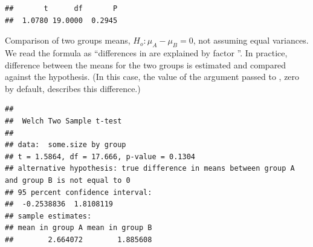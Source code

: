 \documentclass[krantz2]{krantz}\usepackage{knitr}
\begin{document}
\begin{knitrout}\footnotesize
{}\color{fgcolor}\begin{kframe}
\begin{alltt}
 \hlkwb{=} \hlstd{(}\hlopt{$} \hlopt{/} 
 \hlkwb{=} \hlstd{(}\hlopt{$} \hlopt{-} \hlstd{)} \hlopt{/}  
 \hlkwb{<-}   \hlstd{=}  \hlopt{-} \hlstd{,}  \hlstd{=} \hlstd{)} \hlopt{*}  
\hlstd{(}\hlstd{(}   \hlstd{=}  \hlopt{-} \hlstd{,}   \hlstd{)} 
\end{alltt}
\begin{verbatim}
##       t      df       P 
##  1.0780 19.0000  0.2945
\end{verbatim}
\end{kframe}
\end{knitrout}

Comparison of two groups means, $H_o: {\mu}_A - {\mu}_B = 0$, not assuming equal variances. We read the formula  as ``differences in  are explained by factor ''. In practice, difference between the means for the two groups is estimated and compared against the hypothesis. (In this case, the value of the argument passed to , zero by default, describes this difference.)

\begin{knitrout}\footnotesize
{}\color{fgcolor}\begin{kframe}
\begin{alltt}
 \hlopt{~}   
\end{alltt}
\begin{verbatim}
## 
## 	Welch Two Sample t-test
## 
## data:  some.size by group
## t = 1.5864, df = 17.666, p-value = 0.1304
## alternative hypothesis: true difference in means between group A and group B is not equal to 0
## 95 percent confidence interval:
##  -0.2538836  1.8108119
## sample estimates:
## mean in group A mean in group B 
##        2.664072        1.885608
\end{verbatim}
\end{kframe}
\end{knitrout}
\end{document}
